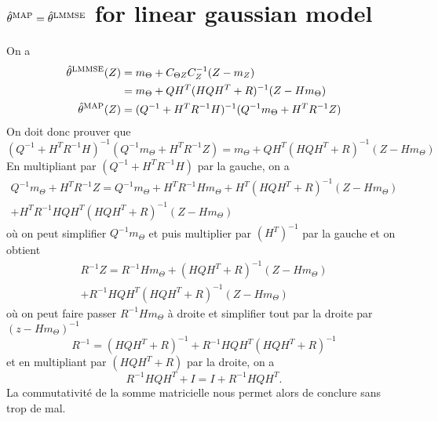 \section{$\hat{\theta}^{\mathrm{MAP}} = \hat{\theta}^{\mathrm{LMMSE}}$ for linear gaussian model}
\label{ann:maplmmselingauss}
On a
\begin{align*}
  \hat{\theta}^{\mathrm{LMMSE}}(Z) & = m_\Theta + C_{\Theta Z}C_{Z}^{-1}(Z - m_Z)\\
                & = m_\Theta + QH^T(HQH^T+R)^{-1}(Z - Hm_\Theta)\\
  \hat{\theta}^{\mathrm{MAP}}(Z) & = (Q^{-1}+H^TR^{-1}H)^{-1}(Q^{-1}m_\Theta+H^TR^{-1}Z)
\end{align*}
On doit donc prouver que
\[ (Q^{-1}+H^TR^{-1}H)^{-1}(Q^{-1}m_\Theta+H^TR^{-1}Z) = m_\Theta + QH^T(HQH^T+R)^{-1}(Z - Hm_\Theta) \]
En multipliant par $(Q^{-1}+H^TR^{-1}H)$ par la gauche, on a
\begin{multline*}
   Q^{-1}m_\Theta+H^TR^{-1}Z = Q^{-1}m_\Theta + H^TR^{-1}H m_\Theta + H^T(HQH^T+R)^{-1}(Z - Hm_\Theta)\\
   + H^TR^{-1}HQH^T(HQH^T+R)^{-1}(Z - Hm_\Theta)
\end{multline*}
où on peut simplifier $Q^{-1}m_\Theta$ et puis multiplier par $(H^T)^{-1}$ par la gauche et on obtient
\begin{multline*}
  R^{-1}Z = R^{-1}H m_\Theta + (HQH^T+R)^{-1}(Z - Hm_\Theta)\\
  + R^{-1}HQH^T(HQH^T+R)^{-1}(Z - Hm_\Theta)
\end{multline*}
où on peut faire passer $R^{-1}Hm_\Theta$ à droite et simplifier tout par la droite par $(z-Hm_\Theta)^{-1}$
\[
  R^{-1} = (HQH^T+R)^{-1} + R^{-1}HQH^T(HQH^T+R)^{-1}
\]
et en multipliant par $(HQH^T+R)$ par la droite, on a
\[
  R^{-1}HQH^T + I = I + R^{-1}HQH^T.
\]
La commutativité de la somme matricielle nous permet alors de conclure sans trop de mal.


